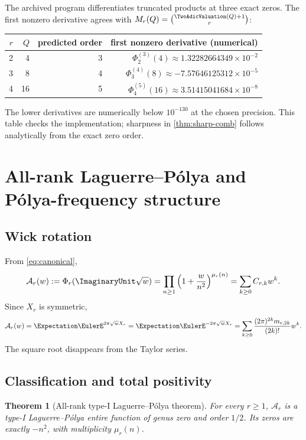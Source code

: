 \documentclass[11pt,oneside]{article}
\newtheorem{theorem}{Theorem}[section]
\theoremstyle{definition}
\theoremstyle{remark}
\newcommand{\Ar}{\mathcal A}
\begin{document}
The archived program differentiates truncated products at three exact zeros.
The first nonzero derivative agrees with
$M_r(Q)=\binom{\TwoAdicValuation(Q)+1}{r}$:
\begin{center}
\begin{tabular}{@{}rrrr@{}}
\toprule
$r$ & $Q$ & predicted order & first nonzero derivative (numerical)\\
\midrule
2 & 4  & 3 & $\Phi_2^{(3)}(4)\approx 1.32282664349\times10^{-2}$\\
3 & 8  & 4 & $\Phi_3^{(4)}(8)\approx-7.57646125312\times10^{-5}$\\
4 & 16 & 5 & $\Phi_4^{(5)}(16)\approx 3.51415041684\times10^{-8}$\\
\bottomrule
\end{tabular}
\end{center}
The lower derivatives are numerically below $10^{-130}$ at the chosen
precision.  This table checks the implementation; sharpness in
\cref{thm:sharp-comb} follows analytically from the exact zero order.

\section{All-rank Laguerre--P\'olya and P\'olya-frequency structure}

\subsection{Wick rotation}

From \eqref{eq:canonical},
\begin{equation}\label{eq:A-product}
 \Ar_r(w):=\Phi_r(\ImaginaryUnit\sqrt w)
 =\prod_{n\geq1}\left(1+\frac{w}{n^2}\right)^{\mu_r(n)}
 =\sum_{k\geq0}C_{r,k}w^k.
\end{equation}
Since $X_r$ is symmetric,
\begin{equation}\label{eq:A-mgf}
 \Ar_r(w)=\Expectation\EulerE^{2\pi\sqrt w X_r}=\Expectation\EulerE^{-2\pi\sqrt w X_r}
 =\sum_{k\geq0}\frac{(2\pi)^{2k}m_{r,2k}}{(2k)!}w^k.
\end{equation}
The square root disappears from the Taylor series.

\subsection{Classification and total positivity}

\begin{theorem}[All-rank type-I Laguerre--P\'olya theorem]\label{thm:LP-all}
For every $r\geq1$, $\Ar_r$ is a type-I Laguerre--P\'olya entire function of
genus zero and order $1/2$.  Its zeros are exactly $-n^2$, with multiplicity
$\mu_r(n)$.
\end{theorem}
\end{document}
